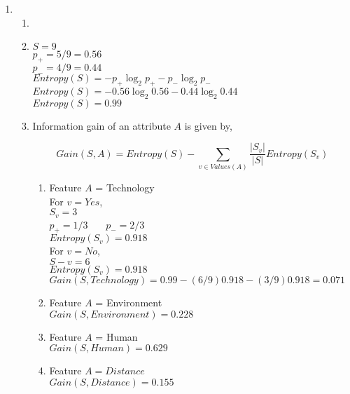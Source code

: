\begin{enumerate}
\item 
\begin{enumerate}
\item
\item
$S=9$\\
$p_+ = 5/9 = 0.56$\\
$p_- = 4/9 = 0.44$\\

$Entropy(S) = -p_+\log_2 p_+ - p_-\log_2 p_-$\\
$Entropy(S) = -0.56\log_2 0.56 - 0.44\log_2 0.44$\\
$Entropy(S) = 0.99$

\item
Information gain of an attribute $A$ is given by,

\begin{equation*}
Gain(S,A) = Entropy(S) - \sum_{v \in Values(A)}\frac{|S_v|}{|S|}Entropy(S_v)
\end{equation*}

\begin{enumerate}
\item Feature $A$ = Technology\\

For $v = Yes$,\\
$S_v = 3$\\
$p_+ = 1/3$ \ \ \ 
$p_- = 2/3$\\
$Entropy(S_v) = 0.918$\\

For $v = No$,\\
$S-v = 6$\\
$Entropy(S_v) = 0.918$\\

$Gain(S, Technology) = 0.99 - (6/9)0.918 - (3/9)0.918 = 0.071$\\

\item Feature $A$ = Environment\\
$Gain(S, Environment) = 0.228$\\

\item Feature $A$ = Human\\
$Gain(S, Human) = 0.629$\\

\item Feature $A = Distance$\\
$Gain(S,Distance) = 0.155$\\
\end{enumerate}



\end{enumerate}
\end{enumerate}
